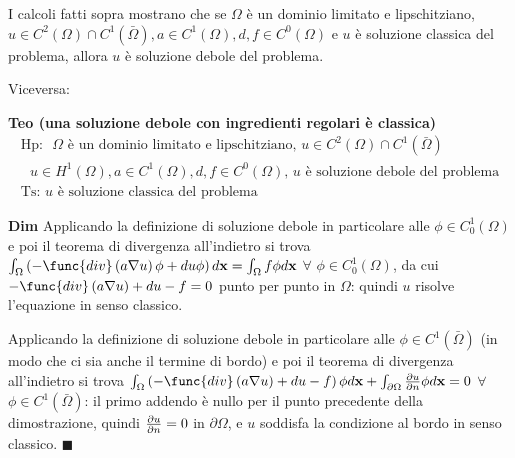 \documentclass{article}
\begin{document}
I calcoli fatti sopra mostrano che se $\Omega $ \`{e} un dominio limitato e
lipschitziano, $u\in C^{2}\left( \Omega \right) \cap C^{1}\left( \bar{\Omega}%
\right) ,a\in C^{1}\left( \Omega \right) ,d,f\in C^{0}\left( \Omega \right) $
e $u$ \`{e} soluzione classica del problema, allora $u$ \`{e} soluzione
debole del problema.

Viceversa:

\textbf{Teo (una soluzione debole con ingredienti regolari \`{e} classica)}%
\begin{gather*}
\text{Hp}\text{:}\text{ }\Omega \text{ \`{e} un dominio limitato e
lipschitziano, }u\in C^{2}\left( \Omega \right) \cap C^{1}\left( \bar{\Omega}%
\right) \\
\text{ }u\in H^{1}\left( \Omega \right) ,a\in C^{1}\left( \Omega \right)
,d,f\in C^{0}\left( \Omega \right) \text{, }u\text{ \`{e} soluzione debole
del problema} \\
\text{Ts}\text{: }u\text{ \`{e} soluzione classica del problema}
\end{gather*}

\textbf{Dim} Applicando la definizione di soluzione debole in particolare
alle $\phi \in C_{0}^{1}\left( \Omega \right) $ e poi il teorema di
divergenza all'indietro si trova $\int_{\Omega }\left( -\func{div}\left(
a\nabla u\right) \phi +du\phi \right) d\mathbf{x}=\int_{\Omega }f\phi d%
\mathbf{x}$ $\forall $ $\phi \in C_{0}^{1}\left( \Omega \right) $, da cui $-%
\func{div}\left( a\nabla u\right) +du-f=0$ punto per punto in $\Omega $:
quindi $u$ risolve l'equazione in senso classico.

Applicando la definizione di soluzione debole in particolare alle $\phi \in
C^{1}\left( \bar{\Omega}\right) $ (in modo che ci sia anche il termine di
bordo) e poi il teorema di divergenza all'indietro si trova $\int_{\Omega
}\left( -\func{div}\left( a\nabla u\right) +du-f\right) \phi d\mathbf{x}%
+\int_{\partial \Omega }\frac{\partial u}{\partial n}\phi d\mathbf{x}=0$ $%
\forall $ $\phi \in C^{1}\left( \bar{\Omega}\right) $: il primo addendo \`{e}
nullo per il punto precedente della dimostrazione, quindi $\frac{\partial u}{%
\partial n}=0$ in $\partial \Omega $, e $u$ soddisfa la condizione al bordo
in senso classico. $\blacksquare $
\end{document}
